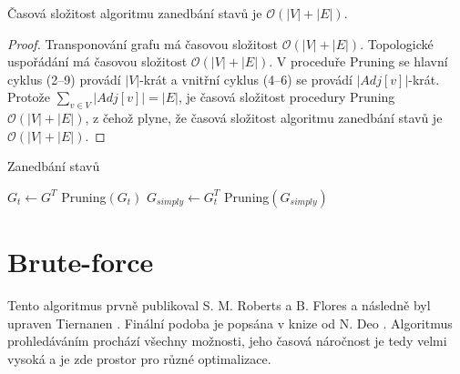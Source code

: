         \begin{theorem}
            Časová složitost algoritmu zanedbání stavů je $\mathcal{O}(|V| + |E|)$.
        \end{theorem}

        \begin{proof}
            Transponování grafu má časovou složitost $\mathcal{O}(|V| + |E|)$. Topologické uspořádání má časovou složitost $\mathcal{O}(|V| + |E|)$. V proceduře Pruning se hlavní cyklus (2--9) provádí $|V|$-krát a vnitřní cyklus (4--6) se provádí $|Adj[v]|$-krát. Protože $\sum_{v \in V}|Adj[v]| = |E|$, je časová složitost procedury Pruning $\mathcal{O}(|V| + |E|)$, z čehož plyne, že časová složitost algoritmu zanedbání stavů je $\mathcal{O}(|V| + |E|)$.
        \end{proof}

        \newpage

        \begin{algorithm}
            \label{algo:ZanedbaniStavu}
            \DontPrintSemicolon
            \caption{Zanedbání stavů}
            \vspace*{0.5em}

            \vspace*{0.5em}

            $G_t \leftarrow G^T$ 
            Pruning$(G_t)$ 
            $G_{simply} \leftarrow G_t^T$ 
            Pruning$(G_{simply})$ 
            \vspace*{0.5em}


        \end{algorithm}

\chapter{Brute-force}
    \label{chapter:Algo1}
    Tento algoritmus prvně publikoval S. M. Roberts a B. Flores \cite{Curcuits1966} a následně byl upraven Tiernanen \cite{Tiernan}. Finální podoba je popsána v knize od N. Deo \cite{Book_algo}. Algoritmus prohledáváním prochází všechny možnosti, jeho časová náročnost je tedy velmi vysoká a je zde prostor pro různé optimalizace.

